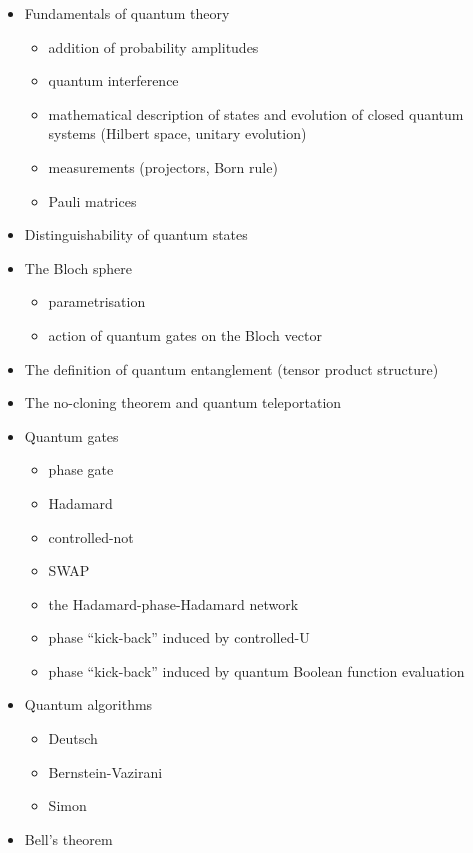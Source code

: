 \documentclass{article}
\providecommand{\tightlist}{%
  \setlength{\itemsep}{0pt}\setlength{\parskip}{0pt}}
\begin{document}
\begin{itemize}
\tightlist
\item
  Fundamentals of quantum theory

  \begin{itemize}
  \tightlist
  \item
    addition of probability amplitudes
  \item
    quantum interference
  \item
    mathematical description of states and evolution of closed quantum systems (Hilbert space, unitary evolution)
  \item
    measurements (projectors, Born rule)
  \item
    Pauli matrices
  \end{itemize}
\item
  Distinguishability of quantum states
\item
  The Bloch sphere

  \begin{itemize}
  \tightlist
  \item
    parametrisation
  \item
    action of quantum gates on the Bloch vector
  \end{itemize}
\item
  The definition of quantum entanglement (tensor product structure)
\item
  The no-cloning theorem and quantum teleportation
\item
  Quantum gates

  \begin{itemize}
  \tightlist
  \item
    phase gate
  \item
    Hadamard
  \item
    controlled-not
  \item
    SWAP
  \item
    the Hadamard-phase-Hadamard network
  \item
    phase ``kick-back'' induced by controlled-U
  \item
    phase ``kick-back'' induced by quantum Boolean function evaluation
  \end{itemize}
\item
  Quantum algorithms

  \begin{itemize}
  \tightlist
  \item
    Deutsch
  \item
    Bernstein-Vazirani
  \item
    Simon
  \end{itemize}
\item
  Bell's theorem


\end{itemize}
\end{document}
